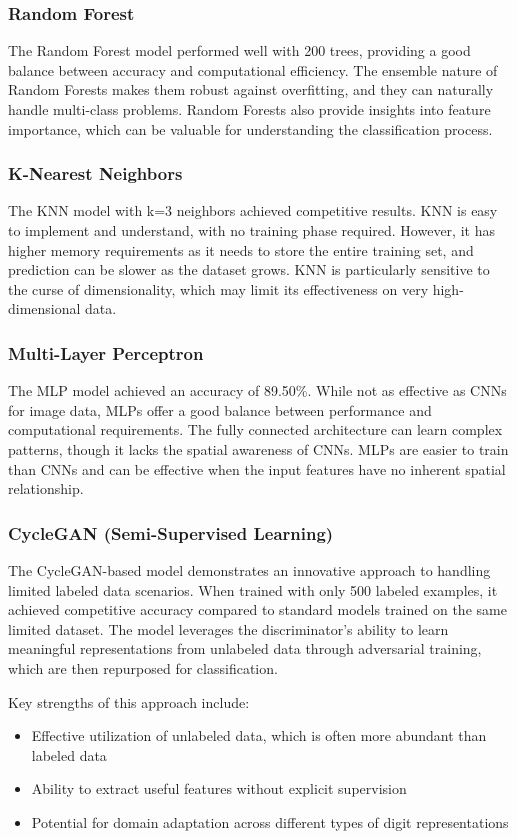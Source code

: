 \documentclass{article}
\begin{document}
\subsubsection{Random Forest}
The Random Forest model performed well with 200 trees, providing a good balance between accuracy and computational efficiency. The ensemble nature of Random Forests makes them robust against overfitting, and they can naturally handle multi-class problems. Random Forests also provide insights into feature importance, which can be valuable for understanding the classification process.

\subsubsection{K-Nearest Neighbors}
The KNN model with k=3 neighbors achieved competitive results. KNN is easy to implement and understand, with no training phase required. However, it has higher memory requirements as it needs to store the entire training set, and prediction can be slower as the dataset grows. KNN is particularly sensitive to the curse of dimensionality, which may limit its effectiveness on very high-dimensional data.

\subsubsection{Multi-Layer Perceptron}
The MLP model achieved an accuracy of 89.50\%. While not as effective as CNNs for image data, MLPs offer a good balance between performance and computational requirements. The fully connected architecture can learn complex patterns, though it lacks the spatial awareness of CNNs. MLPs are easier to train than CNNs and can be effective when the input features have no inherent spatial relationship.

\subsubsection{CycleGAN (Semi-Supervised Learning)}
The CycleGAN-based model demonstrates an innovative approach to handling limited labeled data scenarios. When trained with only 500 labeled examples, it achieved competitive accuracy compared to standard models trained on the same limited dataset. The model leverages the discriminator's ability to learn meaningful representations from unlabeled data through adversarial training, which are then repurposed for classification.

Key strengths of this approach include:
\begin{itemize}
    \item Effective utilization of unlabeled data, which is often more abundant than labeled data
    \item Ability to extract useful features without explicit supervision
    \item Potential for domain adaptation across different types of digit representations
\end{itemize}
\end{document}
